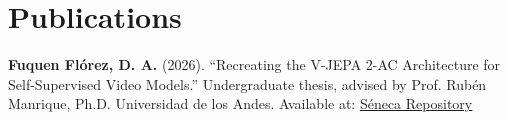 \documentclass[letterpaper,11pt]{article}
\begin{document}
\section{Publications}
\begin{itemize}[leftmargin=0.15in, label={}]
  \small{\item{
    \textbf{Fuquen Flórez, D. A.} (2026). ``Recreating the V-JEPA 2-AC Architecture for Self-Supervised Video Models.'' Undergraduate thesis, advised by Prof. Rubén Manrique, Ph.D. Universidad de los Andes. Available at: \href{https://hdl.handle.net/1992/77925}{\underline{Séneca Repository}}
  }}
\end{itemize}
\end{document}
